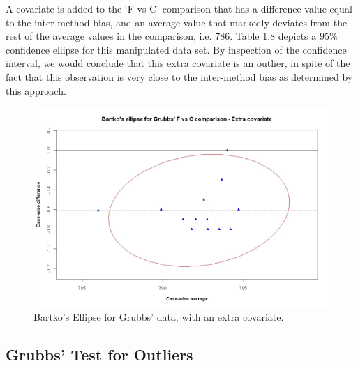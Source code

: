\documentclass[12pt, a4paper]{report}
\theoremstyle{plain}
\theoremstyle{definition}
\theoremstyle{remark}
\begin{document}
A covariate is added to the `F vs C' comparison that has a
difference value equal to the inter-method bias, and an average
value that markedly deviates from the rest of the average values
in the comparison, i.e. 786. Table 1.8 depicts a $95\%$ confidence
ellipse for this manipulated data set. By inspection of the
confidence interval, we would conclude that this extra
covariate is an outlier, in spite of the fact that this
observation is very close to the inter-method bias as determined by this approach.

\begin{figure}[h!]
	\includegraphics[width=130mm]{images/GrubbsBartko2.jpeg}
	\caption{Bartko's Ellipse for Grubbs' data, with an extra covariate.}\label{GrubbsBartko2}
\end{figure}
















\subsection{Grubbs' Test for Outliers}
\end{document}
